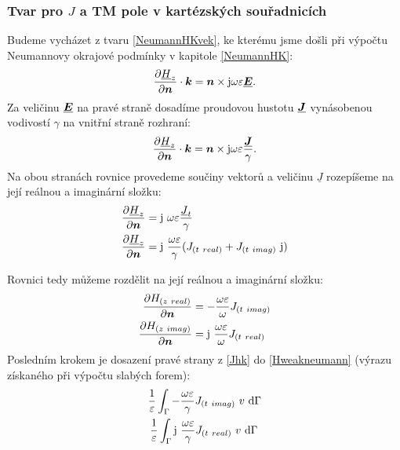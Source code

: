 \documentclass[12pt,a4paper,oneside]{article}
\numberwithin{equation}{section} %
\numberwithin{figure}{section} %
\numberwithin{table}{section} %
\newcommand{\mj}{\mathrm{j}} %
\renewcommand{\vec}[1]{\mbox{\boldmath$#1$}} %
\newcommand{\faz}[1]{{\underline{#1}}} %
\begin{document}
\subsubsection*{Tvar pro \faz{\vec{J}} a TM pole v kartézských souřadnicích}
Budeme vycházet z tvaru \ref{NeumannHKvek}, ke kterému jsme došli při výpočtu Neumannovy okrajové podmínky v kapitole \ref{NeumannHK}:
\begin{equation}
\frac{\partial \faz{H} _z}{\partial \vec{n}} \cdot \vec{k} = \vec{n} \times \mj \omega \varepsilon \faz{\vec{E}}.
\end{equation}
Za veličinu $\faz{\vec{E}}$ na pravé straně dosadíme proudovou hustotu $\faz{\vec{J}}$ vynásobenou vodivostí $\gamma$ na vnitřní straně rozhraní:
\begin{equation}
\frac{\partial \faz{H}_z}{\partial \vec{n}} \cdot \vec{k} = \vec{n} \times \mj \omega \varepsilon \frac{\faz{\vec{J}}}{\gamma}.
\end{equation}
Na obou stranách rovnice provedeme součiny vektorů a veličinu $\faz{J}$ rozepíšeme na její reálnou a imaginární složku:
\begin{subequations}
\begin{align}
\frac{\partial \faz{H}_z}{\partial \vec{n}} &= \mj ~ \omega \varepsilon \frac{\faz{J} _t}{\gamma}
\\
\frac{\partial \faz{H}_z}{\partial \vec{n}} &= \mj ~ \frac{\omega \varepsilon}{\gamma} (J _{(t~real)} + J _{(t~imag)} ~ \mj)
\end{align}
\end{subequations}

Rovnici tedy můžeme rozdělit na její reálnou a imaginární složku:
\begin{subequations}
\label{Jhk}
\begin{align}
\frac{\partial H _{(z~real)}}{\partial \vec{n}} &= - \frac{\omega \varepsilon}{\omega}  J _{(t~imag)}
\\
\frac{\partial H _{(z~imag)}}{\partial \vec{n}} &= \mj ~ \frac{\omega \varepsilon}{\omega} J _{(t~real)}
\end{align}
\end{subequations}
Posledním krokem je dosazení pravé strany z \ref{Jhk} do \ref{Hweakneumann} (výrazu získaného při výpočtu slabých forem):
\begin{subequations}
\begin{align}
\frac{1}{\varepsilon} \int _{\Gamma} - \frac{\omega \varepsilon}{\gamma} J _{(t~imag)} ~ v ~ \ud \Gamma
\\
\frac{1}{\varepsilon} \int _{\Gamma} \mj ~ \frac{\omega \varepsilon}{\gamma} J _{(t~real)} ~ v ~ \ud \Gamma ~
\end{align}
\end{subequations}
\end{document}
